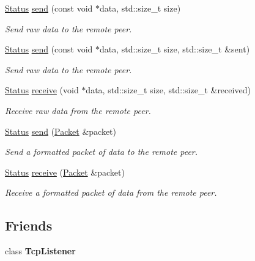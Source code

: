 \begin{DoxyCompactItemize}
\hyperlink{classsf_1_1_socket_a51bf0fd51057b98a10fbb866246176dc}{Status} \hyperlink{classsf_1_1_tcp_socket_affce26ab3bcc4f5b9269dad79db544c0}{send} (const void $\ast$data, std\+::size\+\_\+t size)
\begin{DoxyCompactList}\small\item\em Send raw data to the remote peer. \end{DoxyCompactList}\item 
\hyperlink{classsf_1_1_socket_a51bf0fd51057b98a10fbb866246176dc}{Status} \hyperlink{classsf_1_1_tcp_socket_a31f5b280126a96c6f3ad430f4cbcb54d}{send} (const void $\ast$data, std\+::size\+\_\+t size, std\+::size\+\_\+t \&sent)
\begin{DoxyCompactList}\small\item\em Send raw data to the remote peer. \end{DoxyCompactList}\item 
\hyperlink{classsf_1_1_socket_a51bf0fd51057b98a10fbb866246176dc}{Status} \hyperlink{classsf_1_1_tcp_socket_a90ce50811ea61d4f00efc62bb99ae1af}{receive} (void $\ast$data, std\+::size\+\_\+t size, std\+::size\+\_\+t \&received)
\begin{DoxyCompactList}\small\item\em Receive raw data from the remote peer. \end{DoxyCompactList}\item 
\hyperlink{classsf_1_1_socket_a51bf0fd51057b98a10fbb866246176dc}{Status} \hyperlink{classsf_1_1_tcp_socket_a0f8276e2b1c75aac4a7b0a707b250f44}{send} (\hyperlink{classsf_1_1_packet}{Packet} \&packet)
\begin{DoxyCompactList}\small\item\em Send a formatted packet of data to the remote peer. \end{DoxyCompactList}\item 
\hyperlink{classsf_1_1_socket_a51bf0fd51057b98a10fbb866246176dc}{Status} \hyperlink{classsf_1_1_tcp_socket_aa655352609bc9804f2baa020df3e7331}{receive} (\hyperlink{classsf_1_1_packet}{Packet} \&packet)
\begin{DoxyCompactList}\small\item\em Receive a formatted packet of data from the remote peer. \end{DoxyCompactList}\end{DoxyCompactItemize}
\subsection*{Friends}
\begin{DoxyCompactItemize}
\item 
\mbox{\label{classsf_1_1_tcp_socket_a2b2dd140834917bd44b512236bddea7c}} 
class {\bfseries Tcp\+Listener}
\end{DoxyCompactItemize}
